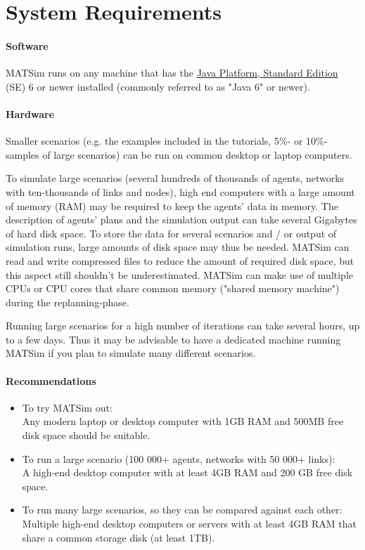 \documentclass[a4paper,11pt]{report}
\begin{document}
\chapter{System Requirements}

\subsubsection{Software}

MATSim runs on any machine that has the \href{http://java.sun.com/javase/downloads/index.jsp}{Java Platform, Standard Edition} (SE) 6 or newer installed (commonly referred to as "Java 6" or newer).

\subsubsection{Hardware}

Smaller  scenarios (e.g. the examples included in the tutorials, 5\%- or  10\%-samples of large scenarios) can be run on common desktop or laptop  computers.

To simulate large scenarios (several hundreds of  thousands of agents, networks with ten-thousands of links and nodes),  high end computers with a large amount of memory (RAM) may be required  to keep the agents' data in memory. The description of agents' plans and  the simulation output can take several Gigabytes of hard disk space. To  store the data for several scenarios and / or output of simulation  runs, large amounts of disk space may thus be needed. MATSim can read  and write compressed files to reduce the amount of required disk space,  but this aspect still shouldn't be underestimated. MATSim can make use  of multiple CPUs or CPU cores that share common memory ("shared memory  machine") during the replanning-phase.

Running large scenarios for  a high number of iterations can take several hours, up to a few days.  Thus it may be advisable to have a dedicated machine running MATSim if  you plan to simulate many different scenarios.

\subsubsection{Recommendations}
\begin{itemize}
	\item To try MATSim out:
\\Any modern laptop or desktop computer with 1GB RAM and 500MB free disk space should be suitable.
	\item To run a large scenario (100 000+ agents, networks with 50 000+ links): 
\\A high-end desktop computer with at least 4GB RAM and 200 GB free disk space.
	\item To run many large scenarios, so they can be compared against each other: 
\\Multiple high-end desktop computers or servers with at least 4GB RAM that share a common storage disk (at least 1TB).
\end{itemize}
\end{document}
